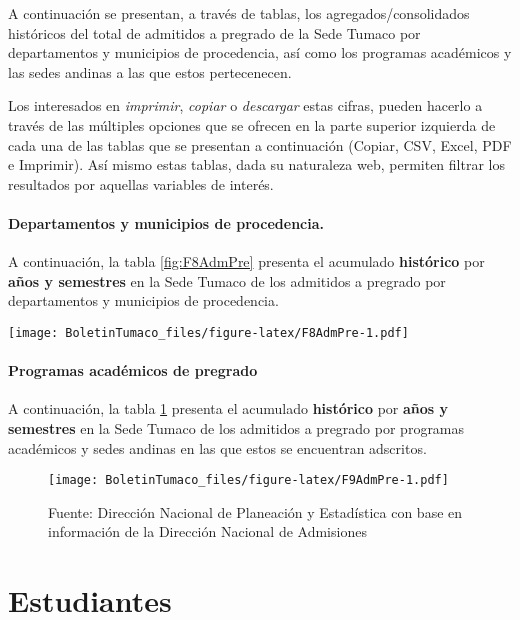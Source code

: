 \documentclass[
]{book}
\begin{document}
A continuación se presentan, a través de tablas, los agregados/consolidados históricos del total de admitidos a pregrado de la Sede Tumaco por departamentos y municipios de procedencia, así como los programas académicos y las sedes andinas a las que estos pertecenecen.

Los interesados en \emph{imprimir}, \emph{copiar} o \emph{descargar} estas cifras, pueden hacerlo a través de las múltiples opciones que se ofrecen en la parte superior izquierda de cada una de las tablas que se presentan a continuación (Copiar, CSV, Excel, PDF e Imprimir). Así mismo estas tablas, dada su naturaleza web, permiten filtrar los resultados por aquellas variables de interés.

\hypertarget{departamentos-y-municipios-de-procedencia.}{%
\subsubsection{Departamentos y municipios de procedencia.}\label{departamentos-y-municipios-de-procedencia.}}

A continuación, la tabla \ref{fig:F8AdmPre} presenta el acumulado \textbf{histórico} por \textbf{años y semestres} en la Sede Tumaco de los admitidos a pregrado por departamentos y municipios de procedencia.

\texttt{[image: BoletinTumaco\_files/figure-latex/F8AdmPre-1.pdf]}

\hypertarget{programas-acaduxe9micos-de-pregrado}{%
\subsubsection{Programas académicos de pregrado}\label{programas-acaduxe9micos-de-pregrado}}

A continuación, la tabla \ref{fig:F9AdmPre} presenta el acumulado \textbf{histórico} por \textbf{años y semestres} en la Sede Tumaco de los admitidos a pregrado por programas académicos y sedes andinas en las que estos se encuentran adscritos.

\begin{figure}
\centering
\texttt{[image: BoletinTumaco\_files/figure-latex/F9AdmPre-1.pdf]}
\caption{\label{fig:F9AdmPre}Fuente: Dirección Nacional de Planeación y Estadística con base en información de la Dirección Nacional de Admisiones}
\end{figure}

\hypertarget{Estudiantes}{%
\chapter{Estudiantes}\label{Estudiantes}}
\end{document}
